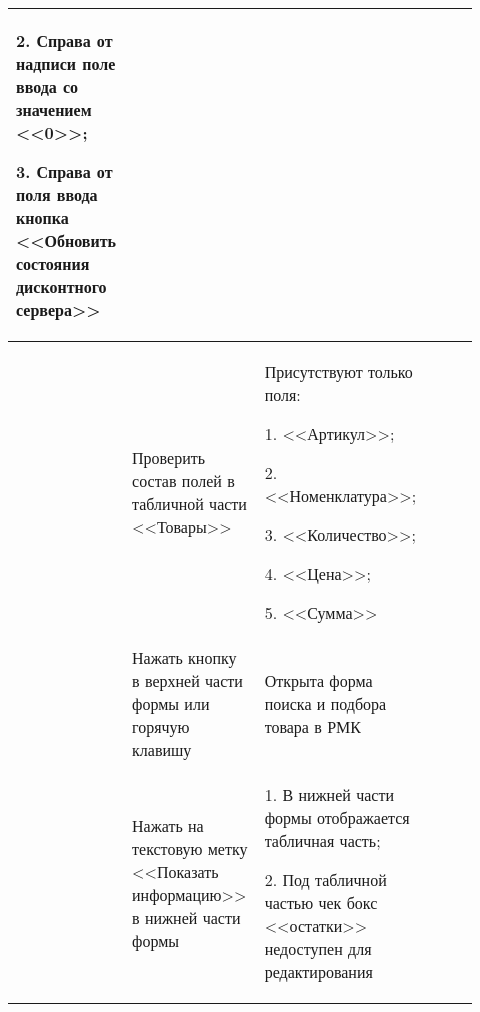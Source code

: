 \begin{longtable}{|p{0.02\linewidth}|p{0.3\linewidth}|p{0.3\linewidth}|p{0.3\linewidth}|}
 2. Справа от надписи поле ввода со значением <<0>>;\par
 3. Справа от поля ввода кнопка <<Обновить состояния дисконтного сервера>> &  \\
 \hline
 \Rownum	& Проверить состав полей в табличной части <<Товары>> & Присутствуют только поля:\par
 1. <<Артикул>>;\par
 2. <<Номенклатура>>;\par
 3. <<Количество>>;\par
 4. <<Цена>>;\par
 5. <<Сумма>> &  \\
 \hline
 \Rownum	& Нажать кнопку \keys{Поиск (F11)} в верхней части формы или горячую клавишу \keys{F11} & Открыта форма поиска и подбора товара в РМК &  \\
 \hline
 \Rownum	& Нажать на текстовую метку <<Показать информацию>> в нижней части формы  & 1. В нижней части формы отображается табличная часть;\par
 2. Под табличной частью чек бокс <<остатки>> недоступен для редактирования &  \\
 \hline

\end{longtable}